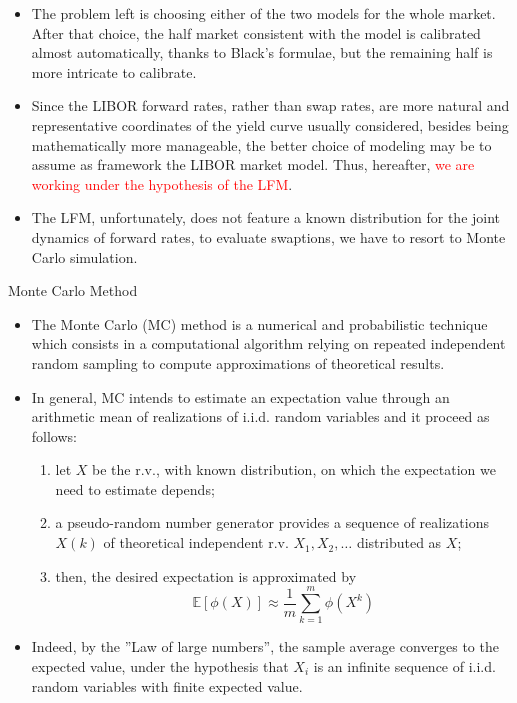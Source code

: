 \documentclass{beamer}
\begin{document}
\begin{frame}
\begin{itemize}
\item The problem left is choosing either of the two models for the whole market. After that choice, the half market consistent with the model is calibrated almost automatically, thanks to Black’s formulae, but the remaining half is more intricate to calibrate.
\item Since the LIBOR forward rates, rather than swap rates, are more natural and representative coordinates of the yield curve usually considered, besides being mathematically more manageable, the better choice of modeling may be to assume as framework the LIBOR market model. Thus, hereafter, \textcolor{red}{we are working under the hypothesis of the LFM}.
\item The LFM, unfortunately, does not feature a known distribution for the joint dynamics of forward rates, to evaluate swaptions, we have to resort to Monte Carlo simulation.%
\end{itemize}
\end{frame}

\begin{frame}{Monte Carlo Method}
\begin{itemize}
\item The Monte Carlo (MC) method is a numerical and probabilistic technique which consists in a computational algorithm relying on repeated independent random sampling to compute approximations of theoretical results.
\item In general, MC intends to estimate an expectation value through an arithmetic mean of realizations of i.i.d. random variables and it proceed as follows: 
\begin{enumerate}
	\item let $X$ be the r.v., with known distribution, on which the expectation we need to estimate depends;
	\item a pseudo-random number generator provides a sequence of realizations $X(k)$ of theoretical independent r.v. $X_1, X_2,\ldots$ distributed as $X$;
  	\item then, the desired expectation is approximated by
	\begin{equation*}
	\mathbb{E}[\phi(X)] \approx \frac{1}{m}\sum_{k=1}^m\phi(X^k)
	\end{equation*}
\end{enumerate}
\item Indeed, by the ”Law of large numbers”, the sample average converges to the expected value, under the hypothesis that $X_i$ is an infinite sequence of i.i.d. random variables with finite expected value.
\end{itemize}
\end{frame}
\end{document}
